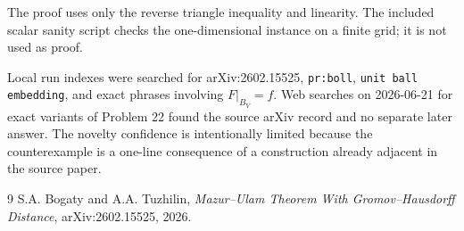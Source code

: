 \documentclass[11pt]{article}
\begin{document}
The proof uses only the reverse triangle inequality and linearity. The included
scalar sanity script checks the one-dimensional instance on a finite grid; it
is not used as proof.

Local run indexes were searched for arXiv:2602.15525, \texttt{pr:boll},
\texttt{unit ball embedding}, and exact phrases involving \(F|_{B_V}=f\). Web
searches on 2026-06-21 for exact variants of Problem 22 found the source arXiv
record and no separate later answer. The novelty confidence is intentionally
limited because the counterexample is a one-line consequence of a construction
already adjacent in the source paper.

\begin{thebibliography}{9}
S.A. Bogaty and A.A. Tuzhilin,
\emph{Mazur--Ulam Theorem With Gromov--Hausdorff Distance},
arXiv:2602.15525, 2026.
\end{thebibliography}
\end{document}
